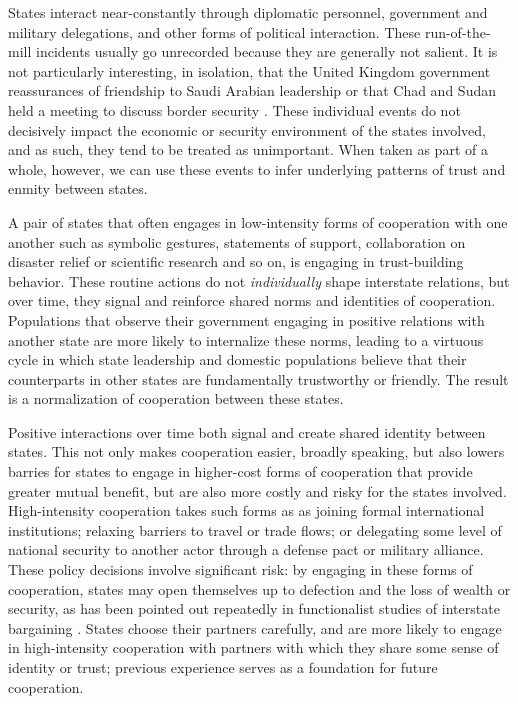 \documentclass[10pt,]{article}
\begin{document}
States interact near-constantly through diplomatic personnel, government
and military delegations, and other forms of political interaction.
These run-of-the-mill incidents usually go unrecorded because they are
generally not salient. It is not particularly interesting, in isolation,
that the United Kingdom government reassurances of friendship to Saudi
Arabian leadership \citep{BBC2016} or that Chad and Sudan held a meeting
to discuss border security \citep{Tribune2016}. These individual events
do not decisively impact the economic or security environment of the
states involved, and as such, they tend to be treated as unimportant.
When taken as part of a whole, however, we can use these events to infer
underlying patterns of trust and enmity between states.

A pair of states that often engages in low-intensity forms of
cooperation with one another such as symbolic gestures, statements of
support, collaboration on disaster relief or scientific research and so
on, is engaging in trust-building behavior. These routine actions do not
\emph{individually} shape interstate relations, but over time, they
signal and reinforce shared norms and identities of cooperation.
Populations that observe their government engaging in positive relations
with another state are more likely to internalize these norms, leading
to a virtuous cycle in which state leadership and domestic populations
believe that their counterparts in other states are fundamentally
trustworthy or friendly. The result is a normalization of cooperation
between these states.

Positive interactions over time both signal and create shared identity
between states. This not only makes cooperation easier, broadly
speaking, but also lowers barries for states to engage in higher-cost
forms of cooperation that provide greater mutual benefit, but are also
more costly and risky for the states involved. High-intensity
cooperation takes such forms as as joining formal international
institutions; relaxing barriers to travel or trade flows; or delegating
some level of national security to another actor through a defense pact
or military alliance. These policy decisions involve significant risk:
by engaging in these forms of cooperation, states may open themselves up
to defection and the loss of wealth or security, as has been pointed out
repeatedly in functionalist studies of interstate bargaining
\citep[e.g.][271-273]{Fearon1998b}. States choose their partners
carefully, and are more likely to engage in high-intensity cooperation
with partners with which they share some sense of identity or trust;
previous experience serves as a foundation for future cooperation.
\end{document}
